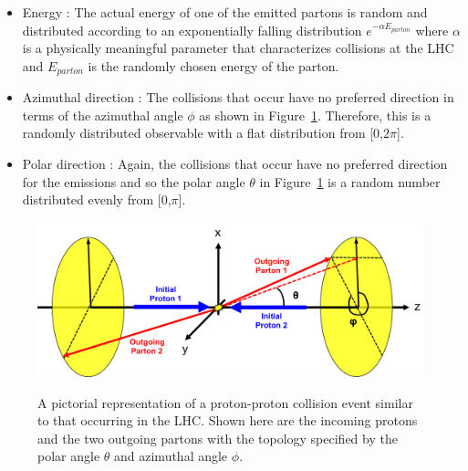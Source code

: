 \documentclass[UKenglish,texlive=2016]{\ATLASLATEXPATH atlasdoc}
\begin{document}
\begin{itemize} 
\item Energy : The actual energy of one of the emitted partons is random and distributed according to an exponentially falling distribution $e^{-\alpha E_{parton}}$ where $\alpha$ is a physically meaningful parameter that characterizes collisions at the LHC and $E_{parton}$ is the randomly chosen energy of the parton.
\item Azimuthal direction : The collisions that occur have no preferred direction in terms of the azimuthal angle $\phi$ as shown in Figure~\ref{fig:direction_event}.  Therefore, this is a randomly distributed observable with a flat distribution from [0,$2\pi$].
\item Polar direction : Again, the collisions that occur have no preferred direction for the emissions and so the polar angle $\theta$ in Figure~\ref{fig:direction_event} is a random number distributed evenly from [0,$\pi$].
\end{itemize}

\begin{figure}
\centering
\includegraphics[width=0.4\linewidth]{figures/jettyevent.png}
\label{fig:direction_event}
\caption{A pictorial representation of a proton-proton collision event similar to that occurring in the LHC.  Shown here are the incoming protons and the two outgoing partons with the topology specified by the polar angle $\theta$ and azimuthal angle $\phi$.}
\label{fig:direction_event}
\end{figure}

\begin{center}
\end{center}
\end{document}
